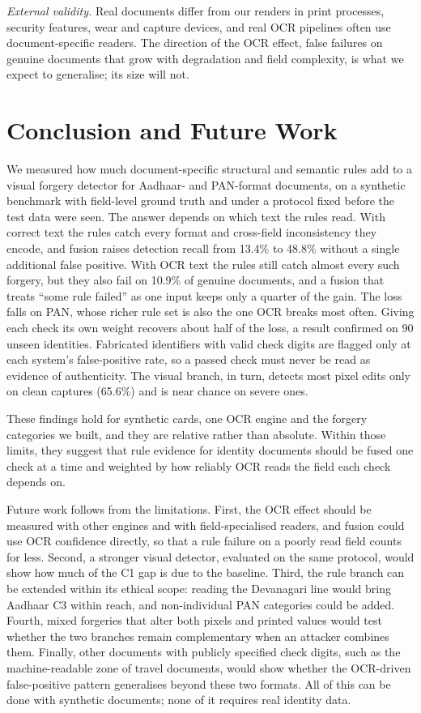\documentclass[conference]{IEEEtran}
\begin{document}
\emph{External validity.} Real documents differ from our renders in
print processes, security features, wear and capture devices, and real
OCR pipelines often use document-specific readers. The direction of
the OCR effect, false failures on genuine documents that grow with
degradation and field complexity, is what we expect to generalise; its
size will not.

\section{Conclusion and Future Work}
\label{sec:conclusion}

We measured how much document-specific structural and semantic rules
add to a visual forgery detector for Aadhaar- and PAN-format documents,
on a synthetic benchmark with field-level ground truth and under a
protocol fixed before the test data were seen. The answer depends on
which text the rules read. With correct text the rules catch every
format and cross-field inconsistency they encode, and fusion raises
detection recall from 13.4\% to 48.8\% without a single additional
false positive. With OCR text the rules still catch almost every such
forgery, but they also fail on 10.9\% of genuine documents, and a fusion
that treats ``some rule failed'' as one input keeps only a quarter of
the gain. The loss falls on PAN, whose richer rule set is also the one
OCR breaks most often. Giving each check its own weight recovers about
half of the loss, a result confirmed on 90 unseen identities. Fabricated
identifiers with valid check digits are flagged only at each system's
false-positive rate, so a passed check must never be read as evidence of
authenticity. The visual branch, in turn, detects most pixel edits
only on clean captures (65.6\%) and is near chance on severe ones.

These findings hold for synthetic cards, one OCR engine and the forgery
categories we built, and they are relative rather than absolute. Within
those limits, they suggest that rule evidence for identity documents
should be fused one check at a time and weighted by how reliably OCR
reads the field each check depends on.

Future work follows from the limitations. First, the OCR effect should
be measured with other engines and with field-specialised readers, and
fusion could use OCR confidence directly, so that a rule failure on a
poorly read field counts for less. Second, a stronger visual detector,
evaluated on the same protocol, would show how much of the C1 gap is due
to the baseline. Third, the rule branch can be extended within its
ethical scope: reading the Devanagari line would bring Aadhaar C3 within
reach, and non-individual PAN categories could be added. Fourth, mixed
forgeries that alter both pixels and printed values would test whether
the two branches remain complementary when an attacker combines them.
Finally, other documents with publicly specified check digits, such as
the machine-readable zone of travel documents, would show whether the
OCR-driven false-positive pattern generalises beyond these two formats.
All of this can be done with synthetic documents; none of it requires
real identity data.
\end{document}
